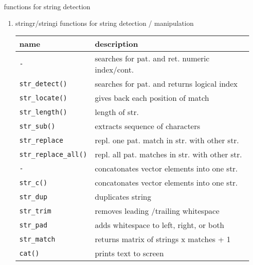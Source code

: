 \documentclass[ignorenonframetext,]{beamer}
\begin{document}
\begin{frame}[fragile]{functions for string detection}

\begin{enumerate}
\def\labelenumi{\arabic{enumi})}
\setcounter{enumi}{5}
\item
  stringr/stringi functions for string detection / manipulation

  \begin{longtable}[c]{@{}ll@{}}
  \toprule
  name & description\tabularnewline
  \midrule
  \endhead
  \texttt{-} & searches for pat. and ret. numeric
  index/cont.\tabularnewline
  \texttt{str\_detect()} & searches for pat. and returns logical
  index\tabularnewline
  \texttt{str\_locate()} & gives back each position of
  match\tabularnewline
  \texttt{str\_length()} & length of str.\tabularnewline
  \texttt{str\_sub()} & extracts sequence of characters\tabularnewline
  \texttt{str\_replace} & repl. one pat. match in str. with other
  str.\tabularnewline
  \texttt{str\_replace\_all()} & repl. all pat. matches in str. with
  other str.\tabularnewline
  \texttt{-} & concatonates vector elements into one str.\tabularnewline
  \texttt{str\_c()} & concatonates vector elements into one
  str.\tabularnewline
  \texttt{str\_dup} & duplicates string\tabularnewline
  \texttt{str\_trim} & removes leading /trailing
  whitespace\tabularnewline
  \texttt{str\_pad} & adds whitespace to left, right, or
  both\tabularnewline
  \texttt{str\_match} & returns matrix of strings x matches +
  1\tabularnewline
  \texttt{cat()} & prints text to screen\tabularnewline
  \bottomrule
  \end{longtable}
\end{enumerate}

\end{frame}
\end{document}
